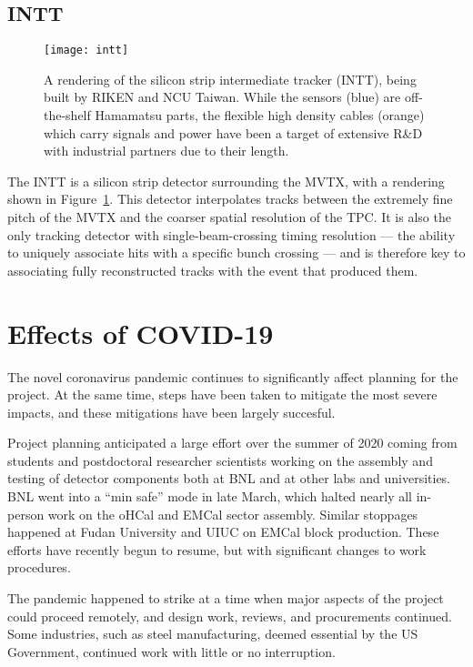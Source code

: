 \subsection{INTT}

\begin{figure}[hbt!]
  \centering
  \texttt{[image: intt]}
  \caption{A rendering of the silicon strip intermediate tracker
    (INTT), being built by RIKEN and NCU Taiwan.  While the sensors
    (blue) are off-the-shelf Hamamatsu parts, the flexible high
    density cables (orange) which carry signals and power have been a
    target of extensive R\&D with industrial partners due to their
    length.}
  \label{fig:intt}
\end{figure}

The INTT is a silicon strip detector surrounding the MVTX, with a rendering shown in
Figure~\ref{fig:intt}.  This detector interpolates tracks between the
extremely fine pitch of the MVTX and the coarser spatial
resolution of the TPC.  It is also the only tracking detector with
single-beam-crossing timing resolution --- the ability to uniquely associate
hits with a specific bunch crossing --- and is therefore key to
associating fully reconstructed tracks with the event that produced
them.

\section{Effects of COVID-19}
\label{sec:covid}

The novel coronavirus pandemic continues to significantly affect
planning for the project.  At the same time, steps have been taken to
mitigate the most severe impacts, and these mitigations have been
largely succesful.

Project planning anticipated a large effort over the summer of 2020
coming from students and postdoctoral researcher scientists working on
the assembly and testing of detector components both at BNL and at
other labs and universities.  BNL went into a ``min safe'' mode in
late March, which halted nearly all in-person work on the oHCal and
EMCal sector assembly.  Similar stoppages happened at Fudan University
and UIUC on EMCal block production.  These efforts have recently begun
to resume, but with significant changes to work procedures.

The pandemic happened to strike at a time when major aspects of the
project could proceed remotely, and design work, reviews, and
procurements continued.  Some industries, such as steel manufacturing,
deemed essential by the US Government, continued work with little or
no interruption.

